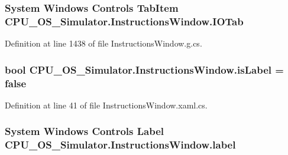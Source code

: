 \subsubsection[{I\+O\+Tab}]{\setlength{\rightskip}{0pt plus 5cm}System Windows Controls Tab\+Item C\+P\+U\+\_\+\+O\+S\+\_\+\+Simulator.\+Instructions\+Window.\+I\+O\+Tab\hspace{0.3cm}{\ttfamily [package]}}\label{class_c_p_u___o_s___simulator_1_1_instructions_window_aaf736178464d8313c866ab6efeae19c5}


Definition at line 1438 of file Instructions\+Window.\+g.\+cs.

\hypertarget{class_c_p_u___o_s___simulator_1_1_instructions_window_a22f860baf7e7b247c3823e076c4b40fb}{}
\subsubsection[{is\+Label}]{\setlength{\rightskip}{0pt plus 5cm}bool C\+P\+U\+\_\+\+O\+S\+\_\+\+Simulator.\+Instructions\+Window.\+is\+Label = false\hspace{0.3cm}{\ttfamily [private]}}\label{class_c_p_u___o_s___simulator_1_1_instructions_window_a22f860baf7e7b247c3823e076c4b40fb}


Definition at line 41 of file Instructions\+Window.\+xaml.\+cs.

\hypertarget{class_c_p_u___o_s___simulator_1_1_instructions_window_a71ce6968170dda46d83aefc71b63a96d}{}
\subsubsection[{label}]{\setlength{\rightskip}{0pt plus 5cm}System Windows Controls Label C\+P\+U\+\_\+\+O\+S\+\_\+\+Simulator.\+Instructions\+Window.\+label\hspace{0.3cm}{\ttfamily [package]}}\label{class_c_p_u___o_s___simulator_1_1_instructions_window_a71ce6968170dda46d83aefc71b63a96d}


